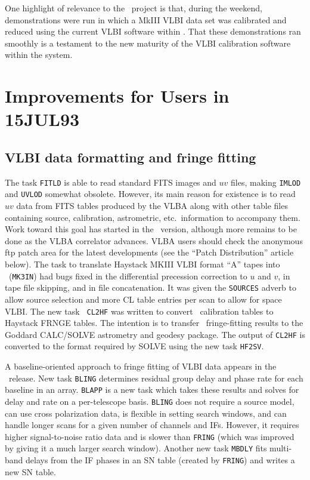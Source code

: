 One highlight of relevance to the \AIPS\ project is that, during the
weekend, demonstrations were run in which a MkIII VLBI data set was
calibrated and reduced using the current VLBI software within
\hbox{{\AIPS}}.  That these demonstrations ran smoothly is a testament
to the new maturity of the VLBI calibration software within the
system.

\section{Improvements for Users in 15JUL93}

\subsection{VLBI data formatting and fringe fitting}

The task {\tt FITLD} is able to read standard FITS images and $uv$
files, making {\tt IMLOD} and {\tt UVLOD} somewhat obsolete.  However,
its main reason for existence is to read $uv$ data from FITS tables
produced by the VLBA along with other table files containing source,
calibration, astrometric, etc.~information to accompany them.  Work
toward this goal has started in the \RELEASENAME\ version, although
more remains to be done as the VLBA correlator advances.  VLBA users
should check the anonymous ftp patch area for the latest developments
(see the ``Patch Distribution'' article below).  The task to translate
Haystack MKIII VLBI format ``A'' tapes into \AIPS\ ({\tt MK3IN}) had
bugs fixed in the differential precession correction to $u$ and $v$,
in tape file skipping, and in file concatenation.  It was given the
{\tt SOURCES} adverb to allow source selection and more CL table
entries per scan to allow for space \hbox{{VLBI}}.  The new task {\tt
CL2HF} was written to convert \AIPS\ calibration tables to Haystack
FRNGE tables.  The intention is to transfer \AIPS\ fringe-fitting
results to the Goddard CALC/SOLVE astrometry and geodesy package.  The
output of {\tt CL2HF} is converted to the format required by SOLVE
using the new task \hbox{{\tt HF2SV}}.

A baseline-oriented approach to fringe fitting of VLBI data appears in
the \RELEASENAME\ release.  New task {\tt BLING} determines residual
group delay and phase rate for each baseline in an array.  {\tt BLAPP}
is a new task which takes these results and solves for delay and rate
on a per-telescope basis.  {\tt BLING} does not require a source
model, can use cross polarization data, is flexible in setting search
windows, and can handle longer scans for a given number of channels
and IFs.  However, it requires higher signal-to-noise ratio data and
is slower than {\tt FRING} (which was improved by giving it a much
larger search window).  Another new task {\tt MBDLY} fits multi-band
delays from the IF phases in an SN table (created by {\tt FRING}) and
writes a new SN table.

